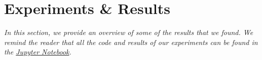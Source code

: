 \chapter{Experiments \& Results}
\textit{In this section, we provide an overview of some of the results that we found. We remind the reader that all the code and results of our experiments can be found in the \href{https://github.com/ncocacola/econml/blob/master/econml.ipynb}{Jupyter Notebook}.}



